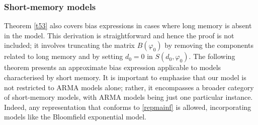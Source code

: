 {{\subsubsection{Short-memory models} \label{bshortm}

Theorem \ref{t53} also covers bias expressions in cases where long memory is absent in the model. This derivation is straightforward and hence the proof is not included; it involves truncating the matrix $B(\varphi_0)$ by removing the components related to long memory and by setting $d_0 = 0$ in $S(d_0,\varphi_0)$. The following theorem presents an approximate bias expression applicable to models characterised by short memory. It is important to emphasise that our model is not restricted to ARMA models alone; rather, it encompasses a broader category of short-memory models, with ARMA models being just one particular instance. Indeed, any representation that conforms to \eqref{repmainf} is allowed, incorporating models like the Bloomfield exponential model.

}}
